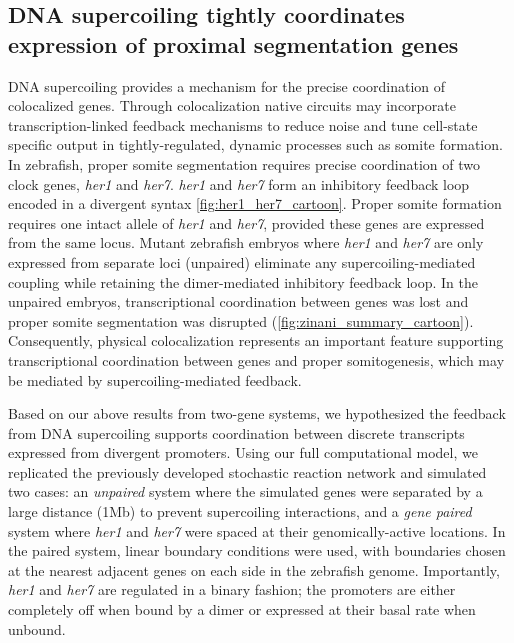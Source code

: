 \documentclass[11pt]{article}
\begin{document}
\subsection{DNA supercoiling tightly coordinates expression of proximal segmentation genes}
DNA supercoiling provides a mechanism for the precise coordination of colocalized genes. Through colocalization native circuits may incorporate transcription-linked feedback mechanisms to reduce noise and tune cell-state specific output in tightly-regulated, dynamic processes such as somite formation. In zebrafish, proper somite segmentation requires precise coordination of two clock genes, \textit{her1} and \textit{her7}.   \textit{her1} and \textit{her7} form an inhibitory feedback loop encoded in a divergent syntax \cref{fig:her1_her7_cartoon}. Proper somite formation requires one intact allele of \textit{her1} and \textit{her7}, provided these genes are expressed from the same locus\Textcite{zinaniPairingSegmentationClock2021}.  Mutant zebrafish embryos where \emph{her1} and \emph{her7} are only expressed from separate loci (unpaired) eliminate any supercoiling-mediated coupling while retaining the dimer-mediated inhibitory feedback loop. In the unpaired embryos, transcriptional coordination between genes was lost and proper somite segmentation was disrupted (\cref{fig:zinani_summary_cartoon}). Consequently, physical colocalization represents an important feature supporting transcriptional coordination between genes and proper somitogenesis, which may be mediated by supercoiling-mediated feedback.

Based on our above results from two-gene systems, we hypothesized the feedback from DNA supercoiling supports coordination between discrete transcripts expressed from divergent promoters. Using our full computational model, we replicated the previously developed stochastic reaction network and simulated two cases: an \emph{unpaired} system where the simulated genes were separated by a large distance (1Mb) to prevent supercoiling interactions, and a \emph{gene paired} system where \textit{her1} and \textit{her7} were spaced at their genomically-active locations. In the paired system, linear boundary conditions were used, with boundaries chosen at the nearest adjacent genes on each side in the zebrafish genome. Importantly, \textit{her1} and \textit{her7} are regulated in a binary fashion; the promoters are either completely off when bound by a dimer or expressed at their basal rate when unbound.
\end{document}
